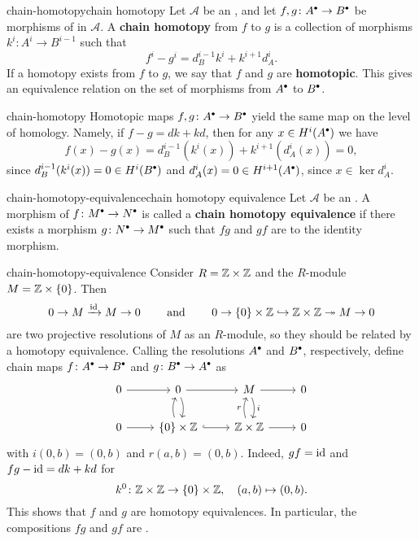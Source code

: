 \begin{topic}{chain-homotopy}{chain homotopy}
    Let $\mathcal{A}$ be an , and let $f, g \colon A^\bdot \to B^\bdot$ be morphisms of  in $\mathcal{A}$. A \textbf{chain homotopy} from $f$ to $g$ is a collection of morphisms $k^i \colon A^i \to B^{i - 1}$ such that
    \[ f^i - g^i = d_B^{i - 1} k^i + k^{i + 1} d_A^i . \]
    If a homotopy exists from $f$ to $g$, we say that $f$ and $g$ are \textbf{homotopic}. This gives an equivalence relation on the set of morphisms from $A^\bdot$ to $B^\bdot$.
\end{topic}

\begin{example}{chain-homotopy}
    Homotopic maps $f, g \colon A^\bdot \to B^\bdot$ yield the same map on the level of homology. Namely, if $f - g = dk + kd$, then for any $x \in H^i(A^\bdot)$ we have
    \[ f(x) - g(x) = d_B^{i - 1}(k^i(x)) + k^{i + 1}(d_A^i(x)) = 0 , \]
    since $d_B^{i - 1}(k^i(x)) = 0 \in H^{i}(B^\bdot)$ and $d_A^i(x) = 0 \in H^{i + 1}(A^\bdot)$, since $x \in \ker d_A^i$.
\end{example}

\begin{topic}{chain-homotopy-equivalence}{chain homotopy equivalence}
    Let $\mathcal{A}$ be an . A morphism of  $f \colon M^\bdot \to N^\bdot$ is called a \textbf{chain homotopy equivalence} if there exists a morphism $g \colon N^\bdot \to M^\bdot$ such that $fg$ and $gf$ are  to the identity morphism.
\end{topic}

\begin{example}{chain-homotopy-equivalence}
    Consider $R = \mathbb{Z} \times \mathbb{Z}$ and the $R$-module $M = \mathbb{Z} \times \{ 0 \}$. Then
    \[ 0 \to M \xrightarrow{\textup{id}} M \to 0 \qquad \textup{ and } \qquad  0 \to \{ 0 \} \times \mathbb{Z} \hookrightarrow \mathbb{Z} \times \mathbb{Z} \twoheadrightarrow M \to 0 \]
    are two projective resolutions of $M$ as an $R$-module, so they should be related by a homotopy equivalence. Calling the resolutions $A^\bdot$ and $B^\bdot$, respectively, define chain maps $f \colon A^\bdot \to B^\bdot$ and $g \colon B^\bdot \to A^\bdot$ as
    \[ \svg \begin{tikzcd}
        0 \arrow{r} & 0 \arrow[bend left=20]{d} \arrow{r} & M \arrow[bend left=20]{d}{i} \arrow{r} & 0 \\
        0 \arrow{r} & \{ 0 \} \times \ZZ \arrow[bend left=20]{u} \arrow[hookrightarrow]{r} & \ZZ \times \ZZ \arrow[bend left=20]{u}{r} \arrow{r} & 0
    \end{tikzcd} \]
    with $i(0, b) = (0, b)$ and $r(a, b) = (0, b)$. Indeed, $gf = \textup{id}$ and $fg - \textup{id} = dk + kd$ for
    \[ k^0 \colon \mathbb{Z} \times \mathbb{Z} \to \{ 0 \} \times \mathbb{Z}, \quad (a, b) \mapsto (0, b) . \]
    This shows that $f$ and $g$ are homotopy equivalences. In particular, the compositions $fg$ and $gf$ are .
\end{example}

